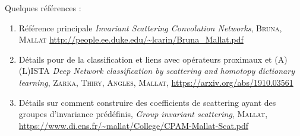 \documentclass[11pt]{article} %
\begin{document}
Quelques références :
\begin{enumerate}
	\item  Référence principale \emph{Invariant Scattering Convolution Networks}, \textsc{Bruna, Mallat} \url{http://people.ee.duke.edu/~lcarin/Bruna_Mallat.pdf}
	\item Détails pour de la classification et liens avec opérateurs proximaux et (A)(L)ISTA \emph{Deep Network classification by scattering and homotopy dictionary learning}, \textsc{Zarka, Thiry, Angles, Mallat}, \url{https://arxiv.org/abs/1910.03561}
	\item Détails sur comment construire des coefficients de scattering ayant des groupes d'invariance prédéfinis, \emph{Group invariant scattering}, \textsc{Mallat}, \url{https://www.di.ens.fr/~mallat/College/CPAM-Mallat-Scat.pdf}
\end{enumerate}
\end{document}
